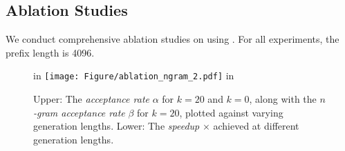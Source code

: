 

\subsection{Ablation Studies}
We conduct comprehensive ablation studies on \ours using \llama. For all experiments, the prefix length is 4096.

\begin{figure}[t!]
     in
    \centering
    \texttt{[image: Figure/ablation\_ngram\_2.pdf]}
     in
    \caption{Upper: The \emph{acceptance rate} $\alpha$ for $k=20$ and $k=0$, along with the \emph{$n$-gram acceptance rate} $\beta$ for $k=20$, plotted against varying generation lengths. Lower: The \emph{speedup} $\times$ achieved at different generation lengths.}
    \label{fig:ablation_ngram_2}
\end{figure}

